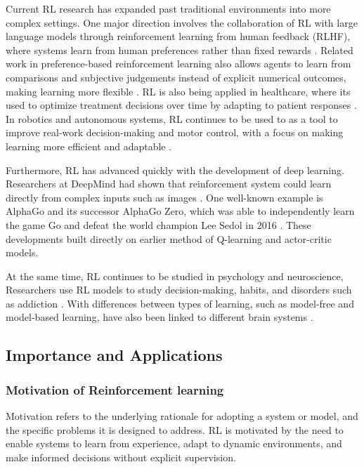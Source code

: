 \documentclass[
  authoryear,
  preprint]{elsarticle}
\begin{document}
Current RL research has expanded past traditional environments into more
complex settings. One major direction involves the collaboration of RL
with large language models through reinforcement learning from human
feedback (RLHF), where systems learn from human preferences rather than
fixed rewards \citep{Ouyang2022}. Related work in preference-based
reinforcement learning also allows agents to learn from comparisons and
subjective judgements instead of explicit numerical outcomes, making
learning more flexible \citep{Christiano2017}. RL is also being applied
in healthcare, where its used to optimize treatment decisions over time
by adapting to patient responses \citep{Gottesman2019}. In robotics and
autonomous systems, RL continues to be used to as a tool to improve
real-work decision-making and motor control, with a focus on making
learning more efficient and adaptable \citep{Kober2013}.

Furthermore, RL has advanced quickly with the development of deep
learning. Researchers at DeepMind had shown that reinforcement system
could learn directly from complex inputs such as images
\citep{Mnih2015}. One well-known example is AlphaGo and its successor
AlphaGo Zero, which was able to independently learn the game Go and
defeat the world champion Lee Sedol in 2016 \citep{Silver2016}. These
developments built directly on earlier method of Q-learning and
actor-critic models.

At the same time, RL continues to be studied in psychology and
neuroscience, Researchers use RL models to study decision-making,
habits, and disorders such as addiction \citep{Glimcher2011}. With
differences between types of learning, such as model-free and
model-based learning, have also been linked to different brain systems
\citep{Daw2005}.

\subsection{Importance and
Applications}\label{importance-and-applications}

\subsubsection{Motivation of Reinforcement
learning}\label{motivation-of-reinforcement-learning}

Motivation refers to the underlying rationale for adopting a system or
model, and the specific problems it is designed to address. RL is
motivated by the need to enable systems to learn from experience, adapt
to dynamic environments, and make informed decisions without explicit
supervision.
\end{document}
